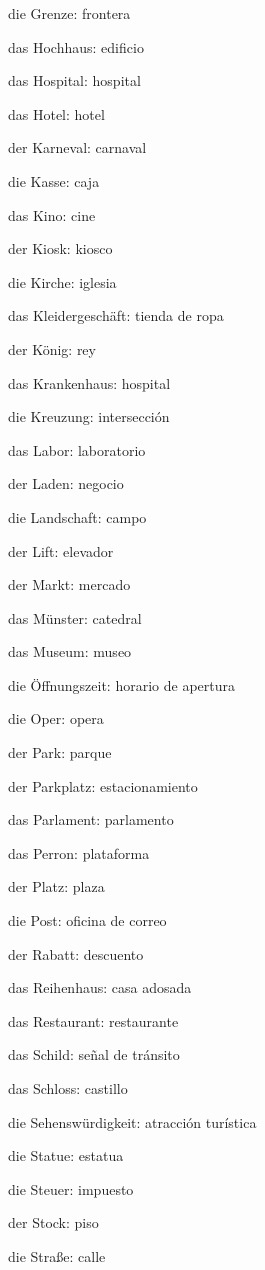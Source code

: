 \begin{multicols}{2}
\begin{myitemize}
\item die Grenze: frontera
\item das Hochhaus: edificio
\item das Hospital: hospital
\item das Hotel: hotel
\item der Karneval: carnaval
\item die Kasse: caja
\item das Kino: cine
\item der Kiosk: kiosco
\item die Kirche: iglesia
\item das Kleidergeschäft: tienda de ropa
\item der König: rey
\item das Krankenhaus: hospital
\item die Kreuzung: intersección
\item das Labor: laboratorio
\item der Laden: negocio
\item die Landschaft: campo
\item der Lift: elevador
\item der Markt: mercado
\item das Münster: catedral
\item das Museum: museo
\item die Öffnungszeit: horario de apertura
\item die Oper: opera
\item der Park: parque
\item der Parkplatz: estacionamiento
\item das Parlament: parlamento
\item das Perron: plataforma
\item der Platz: plaza
\item die Post: oficina de correo
\item der Rabatt: descuento
\item das Reihenhaus: casa adosada
\item das Restaurant: restaurante
\item das Schild: señal de tránsito
\item das Schloss: castillo
\item die Sehenswürdigkeit: atracción turística
\item die Statue: estatua
\item die Steuer: impuesto
\item der Stock: piso
\item die Straße: calle

\end{myitemize}
\end{multicols}
